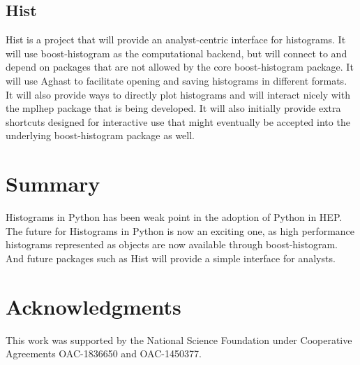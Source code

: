 \documentclass{webofc}
\begin{document}
\subsection{Hist}
\label{sec-hist}

Hist is a project that will provide an analyst-centric interface for histograms. It will use boost-histogram as the computational backend, but will connect to and depend on packages that are not allowed by the core boost-histogram package. It will use Aghast to facilitate opening and saving histograms in different formats. It will also provide ways to directly plot histograms and will interact nicely with the mplhep package that is being developed. It will also initially provide extra shortcuts designed for interactive use that might eventually be accepted into the underlying boost-histogram package as well.


\section{Summary}
\label{sec-4}


Histograms in Python has been weak point in the adoption of Python in HEP. The future for Histograms in Python is now an exciting one, as high performance histograms represented as objects are now available through boost-histogram. And future packages such as Hist will provide a simple interface for analysts.

\section*{Acknowledgments}

This work was supported by the National Science Foundation under Cooperative Agreements OAC-1836650 and OAC-1450377.


\end{document}
